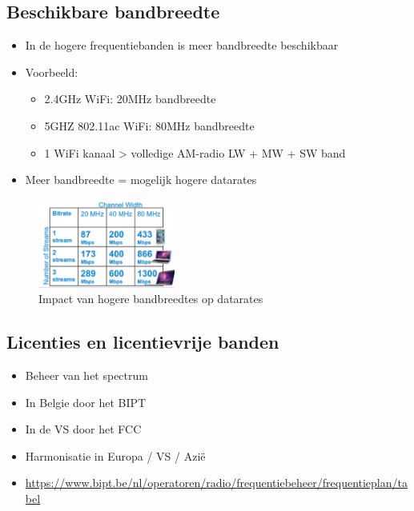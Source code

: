 \documentclass{article}
\begin{document}
\subsection{Beschikbare bandbreedte}
\begin{itemize}
    \item In de hogere frequentiebanden is meer bandbreedte beschikbaar
    \item Voorbeeld:
    \begin{itemize}
        \item 2.4GHz WiFi: 20MHz bandbreedte
        \item 5GHZ 802.11ac WiFi: 80MHz bandbreedte
        \item 1 WiFi kanaal > volledige AM-radio LW + MW + SW band
    \end{itemize}
    \item Meer bandbreedte = mogelijk hogere datarates
\end{itemize}

\begin{figure}[H]
    \centering
    \includegraphics[width=0.4\textwidth]{Screenshot_20200315_160828.png}
    \caption{Impact van hogere bandbreedtes op datarates}
\end{figure}

\subsection{Licenties en licentievrije banden}
\begin{itemize}
    \item Beheer van het spectrum 
    \item In Belgie door het BIPT
    \item In de VS door het FCC
    \item Harmonisatie in Europa / VS / Azië
    \item \url{https://www.bipt.be/nl/operatoren/radio/frequentiebeheer/frequentieplan/tabel}
\end{itemize}
\end{document}
